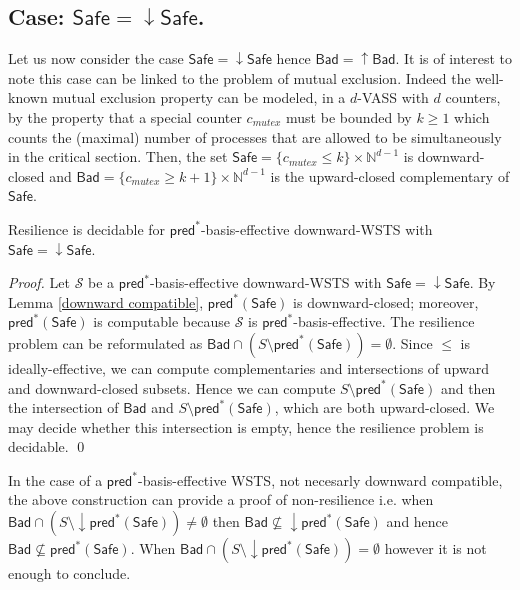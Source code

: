 \documentclass[runningheads]{llncs}
\newcommand{\alain}[1]{\todo[inline,color=red!20]{{\bf AF:} #1}}
\newcommand{\pred}{\textsf{pred}}
\newcommand{\Bad}{\textsf{Bad}}
\newcommand{\Safe}{\textsf{Safe}}
\begin{document}
\subsection{Case: $\Safe=\mathop{\downarrow} \Safe$.}\label{safe-down}


Let us now consider the case $\Safe=\mathop{\downarrow} \Safe$ hence $\Bad=\mathop{\uparrow} \Bad$.
It is of interest to note this case can be linked to the problem of mutual exclusion.
Indeed the well-known mutual exclusion property can be modeled, in a $d$-VASS with $d$ counters, by the property that a special counter $c_{mutex}$ must be bounded by $k \geq 1$ which counts the (maximal) number of processes that are allowed to be simultaneously in the critical section. Then, the set $\Safe =  \{c_{mutex} \leq k\} \times \mathbb{N}^{d-1}$ is downward-closed		and $\Bad =\{c_{mutex} \geq k+1\} \times  \mathbb{N}^{d-1} $ is the upward-closed complementary of $\Safe$. 


%
\begin{theorem}\label{up-down}
{\sc Resilience}  is decidable for $\pred^*$-basis-effective downward-WSTS with 
$\Safe=\mathop{\downarrow} \Safe$.
\end{theorem}

\begin{proof}
Let $\mathscr{S}$ be a $\pred^*$-basis-effective downward-WSTS with 
$\Safe=\mathop{\downarrow} \Safe$.
By Lemma \ref{downward compatible}, $\pred^*(\Safe)$ is downward-closed; moreover, $\pred^*(\Safe)$ is computable because $\mathscr{S}$ is $\pred^*$-basis-effective.
The resilience problem can be reformulated as $\Bad \cap (S \setminus \pred^*(\Safe)) = \emptyset$.
Since $\leq$ is ideally-effective, we can compute complementaries and intersections of upward and downward-closed
 subsets.
Hence we can compute $S \setminus \pred^*(\Safe)$ and then the intersection of
$\Bad$
and
$S \setminus \pred^*(\Safe)$,
which are both upward-closed. We may decide whether this intersection is empty, hence
the resilience problem is decidable. \qed
\end{proof}


In the case
of a $\pred^*$-basis-effective WSTS, not necesarly downward compatible,
the above construction
can provide a proof
of non-resilience
i.e. when
$\Bad \cap (S \setminus \mathop{\downarrow}\pred^*(\Safe)) \neq \emptyset$
then
$\Bad \not\subseteq \mathop{\downarrow}\pred^*(\Safe)$
and hence
$\Bad \not\subseteq \pred^*(\Safe)$.
When $\Bad \cap (S \setminus \mathop{\downarrow}\pred^*(\Safe)) = \emptyset$
however
it is not enough to conclude.\\
\end{document}
